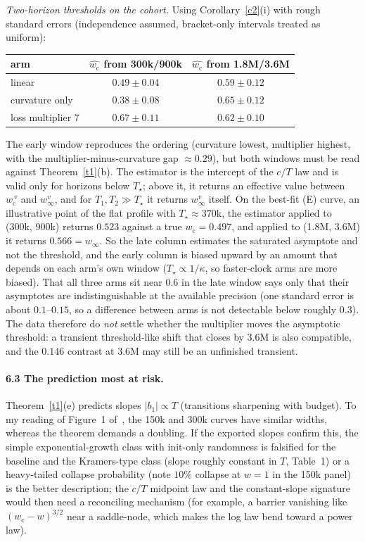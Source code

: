 \documentclass[11pt]{article}
\theoremstyle{definition}
\theoremstyle{remark}
\newcommand{\wcrit}{w_{\mathrm c}}
\newcommand{\Tstar}{T_\star}
\begin{document}
\emph{Two-horizon thresholds on the cohort.} Using Corollary~\ref{c2}(i) with rough standard errors (independence assumed, bracket-only intervals treated as uniform):
\begin{center}\small
\begin{tabular}{lcc}
\toprule
arm & $\widehat{\wcrit}$ from 300k/900k & $\widehat{\wcrit}$ from 1.8M/3.6M\\
\midrule
linear & $0.49\pm0.04$ & $0.59\pm0.12$\\
curvature only & $0.38\pm0.08$ & $0.65\pm0.12$\\
loss multiplier 7 & $0.67\pm0.11$ & $0.62\pm0.10$\\
\bottomrule
\end{tabular}
\end{center}
The early window reproduces the ordering (curvature lowest, multiplier highest, with the multiplier-minus-curvature gap $\approx0.29$), but both windows must be read against Theorem~\ref{t1}(b). The estimator is the intercept of the $c/T$ law and is valid only for horizons below $\Tstar$; above it, it returns an effective value between $\wcrit^{\,v}$ and $w_\infty^v$, and for $T_1,T_2\gg\Tstar$ it returns $w_\infty^v$ itself. On the best-fit (E) curve, an illustrative point of the flat profile with $\Tstar\approx370$k, the estimator applied to (300k, 900k) returns $0.523$ against a true $\wcrit=0.497$, and applied to (1.8M, 3.6M) it returns $0.566=w_\infty$. So the late column estimates the saturated asymptote and not the threshold, and the early column is biased upward by an amount that depends on each arm's own window ($\Tstar\propto1/\kappa$, so faster-clock arms are more biased). That all three arms sit near $0.6$ in the late window says only that their asymptotes are indistinguishable at the available precision (one standard error is about $0.1$--$0.15$, so a difference between arms is not detectable below roughly $0.3$). The data therefore do \emph{not} settle whether the multiplier moves the asymptotic threshold: a transient threshold-like shift that closes by 3.6M is also compatible, and the $0.146$ contrast at 3.6M may still be an unfinished transient.

\paragraph{6.3 The prediction most at risk.}
Theorem~\ref{t1}(e) predicts slopes $|b_1|\propto T$ (transitions sharpening with budget). To my reading of Figure~1 of~\cite{P}, the 150k and 300k curves have similar widths, whereas the theorem demands a doubling. If the exported slopes confirm this, the simple exponential-growth class with init-only randomness is falsified for the baseline and the Kramers-type class (slope roughly constant in $T$, Table~1) or a heavy-tailed collapse probability (note $10\%$ collapse at $w=1$ in the 150k panel) is the better description; the $c/T$ midpoint law and the constant-slope signature would then need a reconciling mechanism (for example, a barrier vanishing like $(\wcrit-w)^{3/2}$ near a saddle-node, which makes the log law bend toward a power law).
\end{document}

